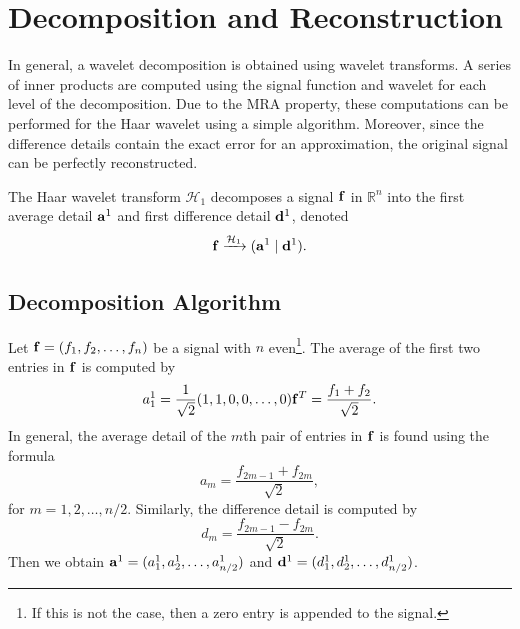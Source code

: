 \documentclass[12pt]{article}
\def\RR{\mathbb{R}}
\theoremstyle{definition}
\begin{document}
  \section{Decomposition and Reconstruction}

  In general, a wavelet decomposition is obtained using wavelet transforms. A series of inner products are computed using the signal function and wavelet for each level of the decomposition. Due to the MRA property, these computations can be performed for the Haar wavelet using a simple algorithm. Moreover, since the difference details contain the exact error for an approximation, the original signal can be perfectly reconstructed.

  The Haar wavelet transform \(\mathcal{H}_1\) decomposes a signal \(\vb{f}\) in \(\RR^n\) into the first average detail \(\vb{a}^1\) and first difference detail \(\vb{d}^1\), denoted
  \begin{equation}
    \vb{f} \xrightarrow{\mathcal{H}_1} (\vb{a}^1 \mid \vb{d}^1).
  \end{equation}

  \subsection{Decomposition Algorithm}

  Let \(\vb{f} = (f_1, f_2, \dots, f_n)\) be a signal with \(n\) even\footnote{If this is not the case, then a zero entry is appended to the signal.}. The average of the first two entries in \(\vb{f}\) is computed by
  \[a_1^1 = \frac{1}{\sqrt{2}} (1,1,0,0,\dots,0) \vb{f}^T = \frac{f_1 + f_2}{\sqrt{2}}.\]
  In general, the average detail of the \(m\)th pair of entries in \(\vb{f}\) is found using the formula
  \begin{equation} \label{eqn:avg-detail}
    a_m = \frac{f_{2m-1} + f_{2m}}{\sqrt{2}},
  \end{equation}
  for \(m = 1, 2, \dots, n/2\). Similarly, the difference detail is computed by
  \begin{equation} \label{eqn:diff-detail}
    d_m = \frac{f_{2m-1} - f_{2m}}{\sqrt{2}}.
  \end{equation}
  Then we obtain \(\vb{a}^1 = (a_1^1, a_2^1, \dots, a_{n/2}^1)\) and \(\vb{d}^1 = (d_1^1, d_2^1, \dots, d_{n/2}^1)\).
\end{document}
